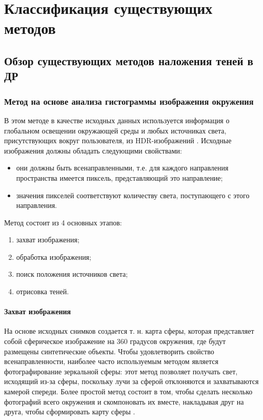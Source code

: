 \chapter{Классификация существующих методов}

\section{Обзор существующих методов наложения теней в ДР}

\subsection{Метод на основе анализа гистограммы изображения окружения}

В этом методе в качестве исходных данных используется информация о глобальном освещении окружающей среды и любых источниках света, присутствующих вокруг пользователя, из HDR-изображений \cite{osti2019real}. Исходные изображения должны обладать следующими свойствами:

\begin{itemize}
	\item они должны быть всенаправленными, т.е. для каждого направления пространства имеется пиксель, представляющий это направление;
	\item значения пикселей соответствуют количеству света, поступающего с этого направления.
\end{itemize}

Метод состоит из 4 основных этапов:

\begin{enumerate}
	\item захват изображения;
	\item обработка изображения;
	\item поиск положения источников света;
	\item отрисовка теней.
\end{enumerate}

\subsubsection*{Захват изображения}

На основе исходных снимков создается т. н. карта сферы, которая представляет собой сферическое изображение на 360 градусов окружения, где будут размещены синтетические объекты. Чтобы удовлетворить свойство всенаправленности, наиболее часто используемым методом является фотографирование зеркальной сферы: этот метод позволяет получать свет, исходящий из-за сферы, поскольку лучи за сферой отклоняются и захватываются камерой спереди. Более простой метод состоит в том, чтобы сделать несколько фотографий всего окружения и скомпоновать их вместе, накладывая друг на друга, чтобы сформировать карту сферы \cite{osti2019real}.

